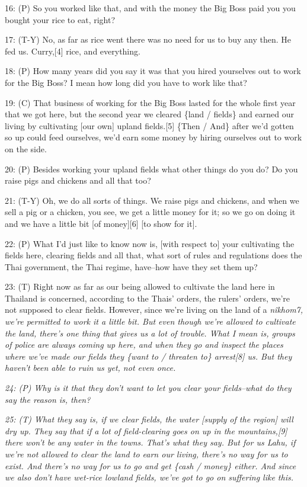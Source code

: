 16: (P) So you worked like that, and with the money the Big Boss paid you you bought
your rice to eat, right?

17: (T-Y) No, as far as rice went there was no need for us to buy any then. He
fed us. Curry,[4] rice, and everything.

18: (P) How many years did you say it was that you hired yourselves out to work
for the Big Boss? I mean how long did you have to work like that?

19: (C) That business of working for the Big Boss lasted for the whole first year
that we got here, but the second year we cleared \{land / fields\} and earned our
living by cultivating [our own] upland fields.[5] \{Then / And\} after we'd gotten
so up could feed ourselves, we'd earn some money by hiring ourselves out to work
on the side.

20: (P) Besides working your upland fields what other things do you do? Do you
raise pigs and chickens and all that too?

21: (T-Y) Oh, we do all sorts of things. We raise pigs and chickens, and when we
sell a pig or a chicken, you see, we get a little money for it; so we go on doing
it and we have a little bit [of money][6] [to show for it].

22: (P) What I'd just like to know now is, [with respect to] your cultivating the
fields here, clearing fields and all that, what sort of rules and regulations does
the Thai government, the Thai regime, have--how have they set them up?

23: (T) Right now as far as our being allowed to cultivate the land here in Thailand
is concerned, according to the Thais' orders, the rulers' orders, we're not supposed
to clear fields. However, since we're living on the land of a \textit{nîkhom7,
we're permitted to work it a little bit. But even though we're allowed to cultivate
the land, there's one thing that gives us a lot of trouble. What I mean is, groups
of police are always coming up here, and when they go and inspect the places where
we've made our fields they \{want to / threaten to\} arrest[8] us. But they haven't
been able to ruin us yet, not even once. }

\textit{24: (P) Why is it that they don't want to let you clear your fields--what
do they say the reason is, then?}

\textit{25: (T) What they say is, if we clear fields, the water [supply of the
region] will dry up. They say that if a lot of field-clearing goes on up in the
mountains,[9] there won't be any water in the towns. That's what they say. But
for us Lahu, if we're not allowed to clear the land to earn our living, there's
no way for us to exist. And there's no way for us to go and get \{cash / money\}
either. And since we also don't have wet-rice lowland fields, we've got to go on
suffering like this. }

